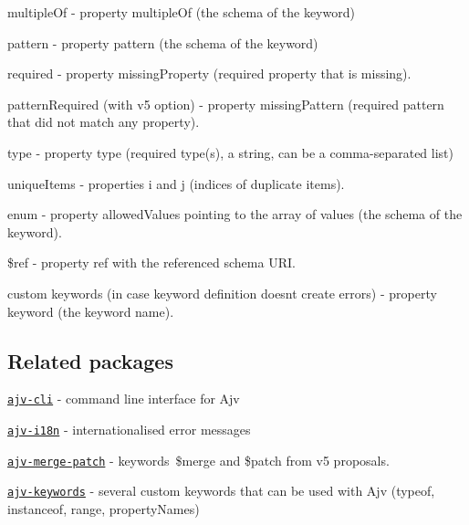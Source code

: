 \begin{DoxyItemize}
\begin{DoxyItemize}
\end{DoxyItemize}
\item {\ttfamily multiple\+Of} -\/ property {\ttfamily multiple\+Of} (the schema of the keyword)
\item {\ttfamily pattern} -\/ property {\ttfamily pattern} (the schema of the keyword)
\item {\ttfamily required} -\/ property {\ttfamily missing\+Property} (required property that is missing).
\item {\ttfamily pattern\+Required} (with v5 option) -\/ property {\ttfamily missing\+Pattern} (required pattern that did not match any property).
\item {\ttfamily type} -\/ property {\ttfamily type} (required type(s), a string, can be a comma-\/separated list)
\item {\ttfamily unique\+Items} -\/ properties {\ttfamily i} and {\ttfamily j} (indices of duplicate items).
\item {\ttfamily enum} -\/ property {\ttfamily allowed\+Values} pointing to the array of values (the schema of the keyword).
\item {\ttfamily \$ref} -\/ property {\ttfamily ref} with the referenced schema U\+RI.
\item custom keywords (in case keyword definition doesn\textquotesingle{}t create errors) -\/ property {\ttfamily keyword} (the keyword name).
\end{DoxyItemize}

\subsection*{Related packages}


\begin{DoxyItemize}
\item \href{https://github.com/epoberezkin/ajv-cli}{\tt ajv-\/cli} -\/ command line interface for Ajv
\item \href{https://github.com/epoberezkin/ajv-i18n}{\tt ajv-\/i18n} -\/ internationalised error messages
\item \href{https://github.com/epoberezkin/ajv-merge-patch}{\tt ajv-\/merge-\/patch} -\/ keywords \$merge and \$patch from v5 proposals.
\item \href{https://github.com/epoberezkin/ajv-keywords}{\tt ajv-\/keywords} -\/ several custom keywords that can be used with Ajv (typeof, instanceof, range, property\+Names)
\end{DoxyItemize}

